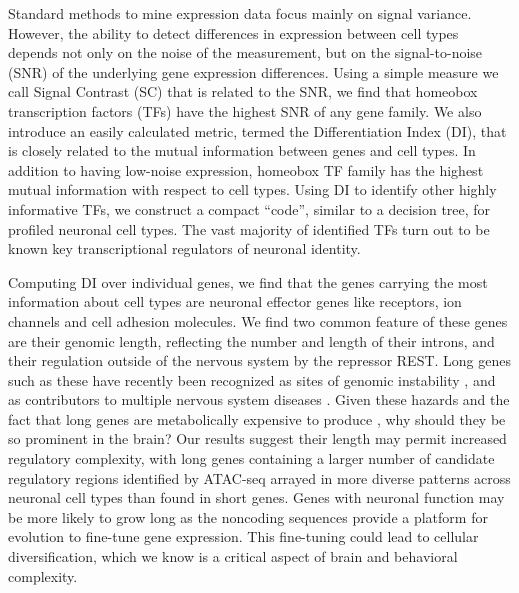 Standard methods to mine expression data focus mainly on signal variance. However, the ability to detect differences in expression between cell types depends not only on the noise of the measurement, but on the signal-to-noise (SNR) of the underlying gene expression differences. Using a simple measure we call Signal Contrast (SC) that is related to the SNR, we find that homeobox transcription factors (TFs) have the highest SNR of any gene family. We also introduce an easily calculated metric, termed the Differentiation Index (DI), that is closely related to the mutual information between genes and cell types. In addition to having low-noise expression, homeobox TF family has the highest mutual information with respect to cell types. Using DI to identify other highly informative TFs, we construct a compact “code”, similar to a decision tree, for profiled neuronal cell types. The vast majority of identified TFs turn out to be known key transcriptional regulators of neuronal identity.

Computing DI over individual genes, we find that the genes carrying the most information about cell types are neuronal effector genes like receptors, ion channels and cell adhesion molecules. We find two common feature of these genes are their genomic length, reflecting the number and length of their introns, and their regulation outside of the nervous system by the repressor REST. Long genes such as these have recently been recognized as sites of genomic instability \cite{Wei_2016}, and as contributors to multiple nervous system diseases \cite{Sugino_2014,Gabel_2015,Zylka_2015}. Given these hazards and the fact that long genes are metabolically expensive to produce \cite{Castillo_Davis_2002}, why should they be so prominent in the brain? Our results suggest their length may permit increased regulatory complexity, with long genes containing a larger number of candidate regulatory regions identified by ATAC-seq arrayed in more diverse patterns across neuronal cell types than found in short genes. Genes with neuronal function may be more likely to grow long as the noncoding sequences provide a platform for evolution to fine-tune gene expression. This fine-tuning could lead to cellular diversification, which we know is a critical aspect of brain and behavioral complexity.
